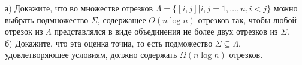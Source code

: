 \documentclass{article}
\begin{document}
а) Докажите, что во множестве отрезков $\Lambda = \{ [i,j] | i,j=1,\ldots ,n, i<j \}$ можно
выбрать подмножество $\Sigma$, содержащее $O(n \log n)$ отрезков так, чтобы любой отрезок из $\Lambda$
представлялся в виде объединения не более двух отрезков из $\Sigma$.\\
б) Докажите, что эта оценка точна, то есть подможество $\Sigma \subseteq \Lambda$, удовлетворяющее условиям, должно содержать $\Omega (n \log n)$ отрезков.
\end{document}

